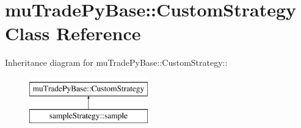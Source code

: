 \hypertarget{classmuTradePyBase_1_1CustomStrategy}{
\section{muTradePyBase::CustomStrategy Class Reference}
\label{classmuTradePyBase_1_1CustomStrategy}
}
Inheritance diagram for muTradePyBase::CustomStrategy::\begin{figure}[H]
\begin{center}
\leavevmode
\includegraphics[height=2cm]{classmuTradePyBase_1_1CustomStrategy}
\end{center}
\end{figure}
